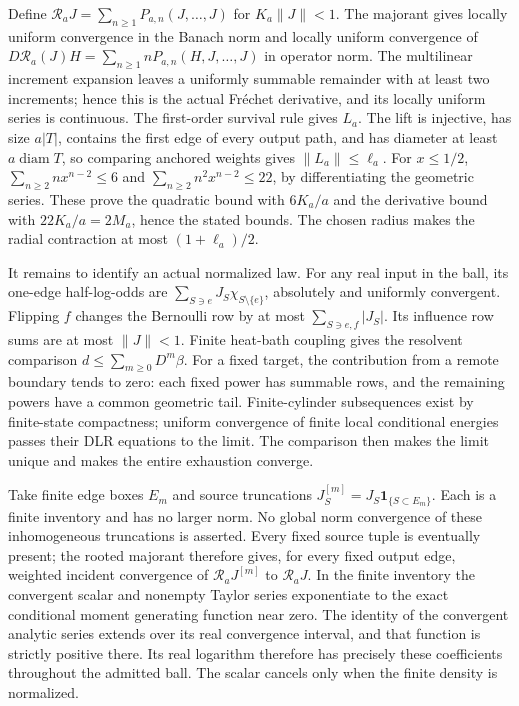 Define \(\mathcal R_aJ=\sum_{n\ge1}P_{a,n}(J,\ldots,J)\) for
\(K_a\|J\|<1\). The majorant gives locally uniform convergence in the
Banach norm and locally uniform convergence of
\(D\mathcal R_a(J)H=\sum_{n\ge1}nP_{a,n}(H,J,\ldots,J)\) in operator
norm. The multilinear increment expansion leaves a uniformly summable
remainder with at least two increments; hence this is the actual
Fr\'echet derivative, and its locally uniform series is continuous.
The first-order survival rule gives \(L_a\). The lift is injective, has
size \(a|T|\), contains the first edge of every output path, and has
diameter at least \(a\operatorname{diam}T\), so comparing anchored weights
gives \(\|L_a\|\le\ell_a\). For \(x\le1/2\),
\(\sum_{n\ge2}nx^{n-2}\le6\) and
\(\sum_{n\ge2}n^2x^{n-2}\le22\), by differentiating the geometric
series. These prove the quadratic bound with \(6K_a/a\) and the derivative
bound with \(22K_a/a=2M_a\), hence the stated bounds. The chosen radius
makes the radial contraction at most \((1+\ell_a)/2\).

It remains to identify an actual normalized law. For any real input in the
ball, its one-edge half-log-odds are
\(\sum_{S\ni e}J_S\chi_{S\setminus\{e\}}\), absolutely and uniformly
convergent. Flipping \(f\) changes the Bernoulli row by at most
\(\sum_{S\ni e,f}|J_S|\). Its influence row sums are at most
\(\|J\|<1\). Finite heat-bath coupling gives the resolvent comparison
\(d\le\sum_{m\ge0}D^m\beta\). For a fixed target, the contribution
from a remote boundary tends to zero: each fixed power has summable rows,
and the remaining powers have a common geometric tail. Finite-cylinder
subsequences exist by finite-state compactness; uniform convergence of
finite local conditional energies passes their DLR equations to the
limit. The comparison then makes the limit unique and makes the entire
exhaustion converge.

Take finite edge boxes \(E_m\) and source truncations
\(J^{[m]}_S=J_S\mathbf1_{\{S\subset E_m\}}\). Each is a finite inventory
and has no larger norm. No global norm convergence of these inhomogeneous
truncations is asserted. Every fixed source tuple is eventually present;
the rooted majorant therefore gives, for every fixed output edge, weighted
incident convergence of \(\mathcal R_aJ^{[m]}\) to
\(\mathcal R_aJ\). In the finite inventory the convergent scalar and
nonempty Taylor series exponentiate to the exact conditional moment
generating function near zero. The identity of the convergent analytic
series extends over its real convergence interval, and that function is
strictly positive there. Its real logarithm therefore has precisely these
coefficients throughout the admitted ball. The scalar cancels only when
the finite density is normalized.

